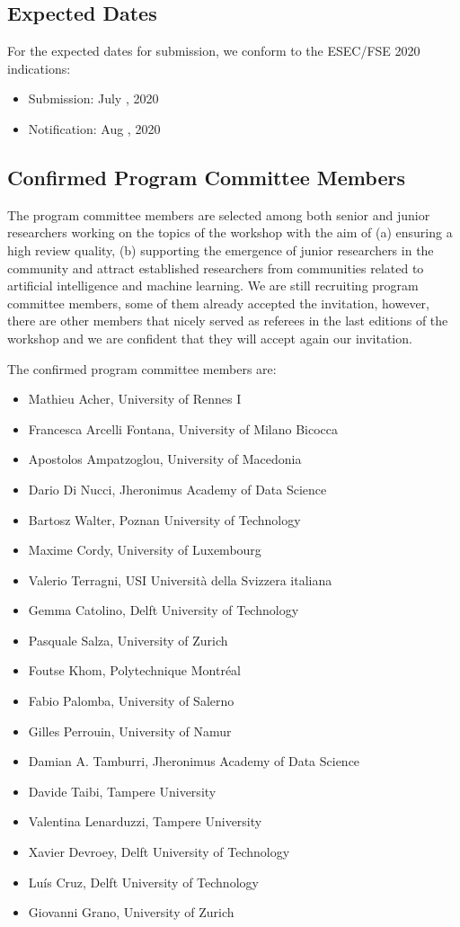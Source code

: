 \subsection{Expected Dates}

For the expected dates for submission, we conform to the ESEC/FSE 2020 indications:
\begin{itemize}[topsep=0.5em, itemsep=0.5em]
	\item Submission: July , 2020
	\item Notification: Aug , 2020
\end{itemize}


\subsection{Confirmed Program Committee Members}
The program committee members are selected among both senior and junior researchers working on the topics of the workshop with the aim of (a) ensuring a high review quality, (b) supporting the emergence of junior researchers in the community and attract established researchers from communities related to artificial intelligence and machine learning.
We are still recruiting program committee members, some of them already accepted the invitation, however, there are other members that nicely served as referees in the last editions of the workshop and we are confident that they will accept again our invitation.

\medskip
\noindent The confirmed program committee members are:
\begin{itemize}[topsep=0.5em, itemsep=0.5em]
	\item Mathieu Acher, University of Rennes I
	\item Francesca Arcelli Fontana, University of  Milano Bicocca
	\item Apostolos Ampatzoglou, University of Macedonia
	\item Dario Di Nucci, Jheronimus Academy of Data Science
	\item Bartosz Walter, Poznan University of Technology
	\item Maxime Cordy, University of Luxembourg
	\item Valerio Terragni, USI Università della Svizzera italiana
	\item Gemma Catolino, Delft University of Technology
	\item Pasquale Salza, University of Zurich
	\item Foutse Khom, Polytechnique Montréal
	\item Fabio Palomba, University of Salerno
	\item Gilles Perrouin, University of Namur
	\item Damian A. Tamburri, Jheronimus Academy of Data Science
	\item Davide Taibi, Tampere University
	\item Valentina Lenarduzzi, Tampere University
	\item Xavier Devroey, Delft University of Technology
	\item Luís Cruz, Delft University of Technology
	\item Giovanni Grano, University of Zurich
\end{itemize}

